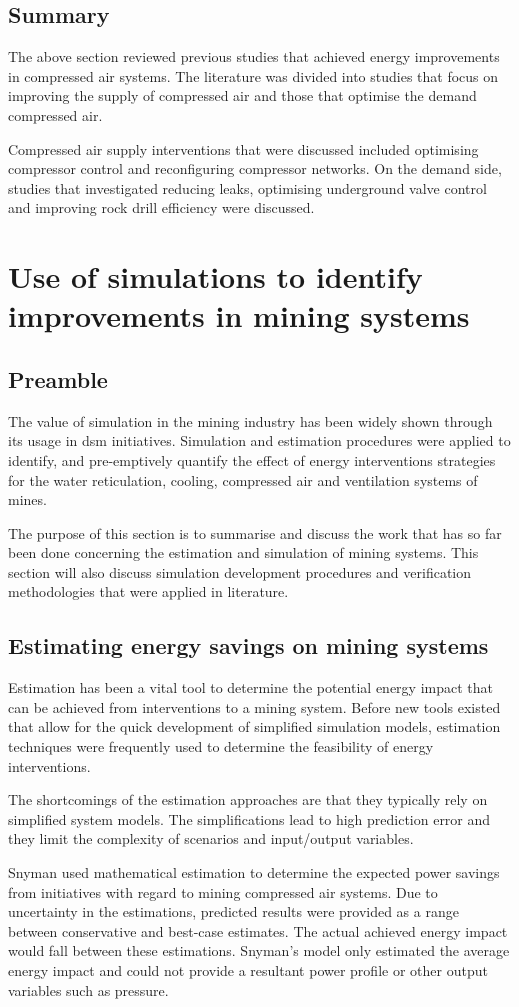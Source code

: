 	\subsection{Summary}
	The above section reviewed previous studies that achieved energy improvements in compressed air systems. The literature was divided into studies that focus on improving the supply of compressed air and those that optimise the demand compressed air.
	\par
	Compressed air supply interventions that were discussed included optimising compressor control and reconfiguring compressor networks. On the demand side, studies that investigated reducing leaks, optimising underground valve control and improving rock drill efficiency were discussed.
\section{Use of simulations to identify improvements in mining systems}
	\subsection{Preamble}
	The value of simulation in the mining industry has been widely shown through its usage in \gls{dsm} initiatives. Simulation and estimation procedures were applied to identify, and pre-emptively quantify the effect of energy interventions strategies for the water reticulation, cooling, compressed air and ventilation systems of mines.
	\par
	 The purpose of this section is to summarise and discuss the work that has so far been done concerning the estimation and simulation of mining systems. This section will also discuss simulation development procedures and verification methodologies that were applied in literature.
	
	\subsection{Estimating energy savings on mining systems }
	Estimation has been a vital tool to determine the potential energy impact that can be achieved from interventions to a mining system. Before new tools existed that allow for the quick development of simplified simulation models, estimation techniques were frequently used to determine the feasibility of energy interventions. 
	\clearpage
	\par 
	The shortcomings of the estimation approaches are that they typically rely on simplified system models. The simplifications lead to high prediction error and they limit the complexity of scenarios and input/output variables.
		\par 
	Snyman \cite{Snyman2011Masters} used mathematical estimation to determine the expected power savings from initiatives with regard to mining compressed air systems. Due to uncertainty in the estimations, \cite{Snyman2011Masters} predicted results were provided as a range between conservative and best-case estimates. The actual achieved energy impact would fall between these estimations. Snyman's model only estimated the average energy impact and could not provide a resultant power profile or other output variables such as pressure.
		 	
